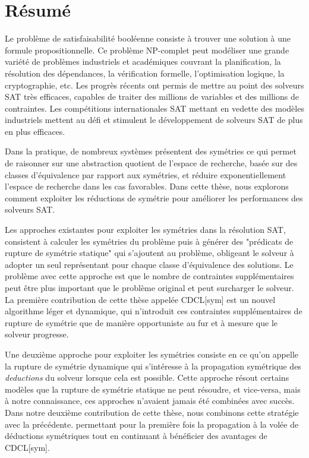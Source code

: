 \chapter*{Résumé}

Le problème de satisfaisabilité booléenne consiste à trouver une solution à une formule  propositionnelle.
Ce problème NP-complet peut modéliser une grande variété de problèmes industriels et académiques couvrant la planification, la résolution des dépendances, la vérification formelle, l'optimisation logique, la cryptographie, etc.
Les  progrès récents ont permis de mettre au point des solveurs SAT très efficaces, capables de traiter des millions de variables et des millions de contraintes. 
Les compétitions internationales SAT mettant en vedette des modèles industriels mettent au défi et stimulent le développement de solveurs SAT de plus en plus efficaces.


Dans la pratique, de nombreux systèmes présentent des symétries ce qui permet de raisonner sur une abstraction quotient de l'espace de recherche, basée sur des classes d'équivalence par rapport aux symétries, et réduire exponentiellement l'espace de recherche dans les cas favorables.
Dans cette thèse, nous explorons comment exploiter les réductions de symétrie pour améliorer les performances des solveurs SAT.


Les approches existantes pour exploiter les symétries dans la résolution SAT, consistent à calculer les symétries du problème puis à générer des "prédicats de rupture de symétrie statique" qui s'ajoutent au problème, obligeant le solveur à adopter un seul représentant pour chaque classe d'équivalence des solutions.
Le problème avec cette approche est que le nombre de contraintes supplémentaires peut être plus important que le problème original et peut surcharger le solveur. La première contribution de cette thèse appelée CDCL[sym] est un nouvel algorithme léger et dynamique, qui n'introduit ces contraintes supplémentaires de rupture de symétrie que de manière opportuniste au fur et à mesure que le solveur progresse.

Une deuxième approche pour exploiter les symétries consiste en ce qu'on appelle la rupture de symétrie dynamique qui s'intéresse à la propagation symétrique des \textit{deductions} du solveur lorsque cela est possible.
Cette approche résout certains modèles que la rupture de symétrie statique ne peut résoudre, et vice-versa, mais à notre connaissance, ces approches n'avaient jamais été combinées avec succès. 
Dans notre deuxième contribution de cette thèse, nous combinons cette stratégie avec la précédente. permettant pour la première fois la propagation à la volée de déductions symétriques tout en continuant à bénéficier des avantages de CDCL[sym].


